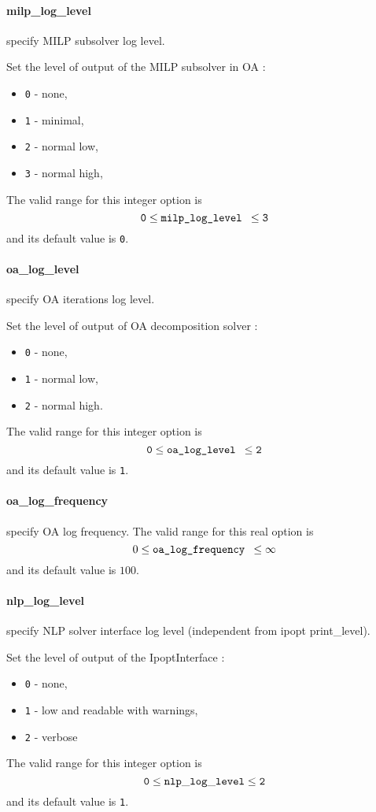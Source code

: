 \paragraph{milp\_log\_level} 
\label{milp_log_level}
specify MILP subsolver log level.

 Set the level of output of the MILP subsolver in
OA :
 \begin{itemize}
  \item {\tt 0} - none,
  \item {\tt 1} - minimal,
  \item {\tt 2} - normal low,
  \item {\tt 3} - normal high,
  \end{itemize}
The valid range for this integer option is
$${\tt 0} \le \hbox{\tt milp\_log\_level } \le {\tt 3}$$
and its default value is {\tt 0}.


\paragraph{oa\_log\_level}
\label{oa_log_level}
 specify OA iterations log level.

 Set the level of output of OA decomposition solver :
 \begin{itemize}
  \item {\tt 0} - none,
  \item {\tt 1} - normal low,
  \item {\tt 2} - normal high.
  \end{itemize}
  The valid range for this integer option is
  $${\tt 0} \le \hbox{\tt oa\_log\_level } \le {\tt 2}$$
  and its default value is {\tt 1}.

\paragraph{oa\_log\_frequency} 
\label{oa_log_frequency}
specify OA log frequency.
  The valid range for this real option is
  $$ 0 \le \hbox{\tt oa\_log\_frequency } \le \infty $$
  and its default value is $100$.


\paragraph{nlp\_log\_level}
\label{nlp_log_level}
 specify NLP solver interface log level (independent from ipopt print\_level).

  Set the level of output of the IpoptInterface :
  \begin{itemize}
  \item {\tt 0} - none,
  \item {\tt 1} - low and readable with warnings,
  \item {\tt 2} - verbose
  \end{itemize}
 The valid range for this integer option is
$${\tt 0} \le {\tt nlp\_log\_level } \le {\tt 2}$$
and its default value is {\tt 1}.

